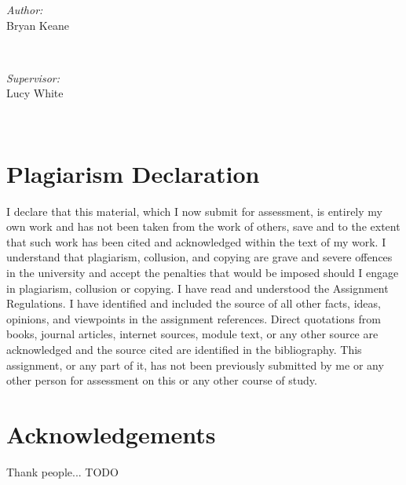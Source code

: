 \documentclass{article}
\begin{document}
\begin{titlepage}
    \begin{minipage}{0.4\textwidth}
    \begin{flushleft} \large
    \emph{Author:}\\
    Bryan Keane 
    \end{flushleft}
    \end{minipage}
    ~
    \begin{minipage}{0.4\textwidth}
    \begin{flushright} \large
    \emph{Supervisor:} \\
    Lucy White
    \end{flushright}
    \end{minipage}\\[2cm]
    
\end{titlepage}

\newpage

\tableofcontents
\newpage

\listoffigures
\newpage

\listoftables
\newpage



\section{Plagiarism Declaration}
I declare that this material, which I now submit for assessment, is entirely my own work and has not been taken from the work of others, save and to the extent that such work has been cited and acknowledged within the text of my work. I understand that plagiarism, collusion, and copying are grave and severe offences in the university and accept the penalties that would be imposed should I engage in plagiarism, collusion or copying. I have read and understood the Assignment Regulations. I have identified and included the source of all other facts, ideas, opinions, and viewpoints in the assignment references. Direct quotations from books, journal articles, internet sources, module text, or any other source are acknowledged and the source cited are identified in the bibliography. This assignment, or any part of it, has not been previously submitted by me or any other person for assessment on this or any other course of study.  



\newpage
\section{Acknowledgements}
Thank people... TODO
\end{document}
